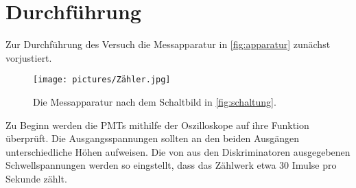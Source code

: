\section{Durchführung}
\label{sec:Durchführung}

Zur Durchführung des Versuch die Messapparatur in \autoref{fig:apparatur} zunächst vorjustiert.
\begin{figure}
    \centering
    \texttt{[image: pictures/Zähler.jpg]}
    \caption{Die Messapparatur nach dem Schaltbild in \autoref{fig:schaltung}.}
    \label{fig:schaltung}
\end{figure}

Zu Beginn werden die PMTs mithilfe der Oszilloskope auf ihre Funktion überprüft.
Die Ausgangsspannungen sollten an den beiden Ausgängen unterschiedliche Höhen aufweisen.
Die von aus den Diskriminatoren ausgegebenen Schwellspannungen werden so eingstellt,
dass das Zählwerk etwa 30 Imulse pro Sekunde zählt.

